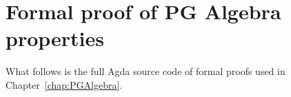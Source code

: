 

















\renewcommand{\chaptername}{Appendix}
\setcounter{chapter}{0}
\renewcommand\thechapter{\Alph{chapter}}

\chapter{Formal proof of PG Algebra properties}

What follows is the full Agda source code of formal proofs used in Chapter~\ref{chap:PGAlgebra}.

\renewcommand \textlambda {\ensuremath{\lambda}}

\setlength{\mathindent}{0.0in}


